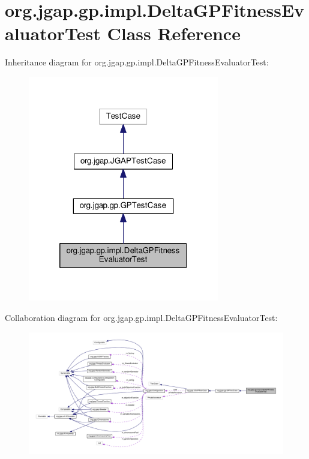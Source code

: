 \hypertarget{classorg_1_1jgap_1_1gp_1_1impl_1_1_delta_g_p_fitness_evaluator_test}{\section{org.\-jgap.\-gp.\-impl.\-Delta\-G\-P\-Fitness\-Evaluator\-Test Class Reference}
\label{classorg_1_1jgap_1_1gp_1_1impl_1_1_delta_g_p_fitness_evaluator_test}
}


Inheritance diagram for org.\-jgap.\-gp.\-impl.\-Delta\-G\-P\-Fitness\-Evaluator\-Test\-:
\nopagebreak
\begin{figure}[H]
\begin{center}
\leavevmode
\includegraphics[width=236pt]{classorg_1_1jgap_1_1gp_1_1impl_1_1_delta_g_p_fitness_evaluator_test__inherit__graph}
\end{center}
\end{figure}


Collaboration diagram for org.\-jgap.\-gp.\-impl.\-Delta\-G\-P\-Fitness\-Evaluator\-Test\-:
\nopagebreak
\begin{figure}[H]
\begin{center}
\leavevmode
\includegraphics[width=350pt]{classorg_1_1jgap_1_1gp_1_1impl_1_1_delta_g_p_fitness_evaluator_test__coll__graph}
\end{center}
\end{figure}
